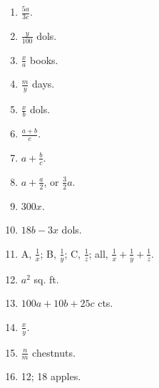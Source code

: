 \documentclass{book}
\begin{document}
\begin{enumerate}
\item $\frac{5a}{3c}$.

\item $\frac{y}{100}$ dols.

\item $\frac{x}{a}$ books.

\item $\frac{m}{y}$ days.

\item $\frac{x}{b}$ dols.

\item $\frac{a + b}{c}$.

\item $a + \frac{b}{c}$.

\item $a + \frac{a}{2}$, or $\frac{3}{2}a$.

\item $300x$.

\item $18b - 3x$ dols.

\item A, $\displaystyle \frac{1}{x}$; B, $\displaystyle
\frac{1}{y}$; C, $\displaystyle \frac{1}{z}$; all, $\displaystyle
\frac{1}{x} + \frac{1}{y} + \frac{1}{z}$.

\item $a^2$ sq. ft.

\item $100a + 10b + 25c$ cts.

\item $\displaystyle \frac{x}{y}$.

\item $\displaystyle \frac{n}{m}$ chestnuts.

\item 12; 18 apples. \end{enumerate}
\end{document}
